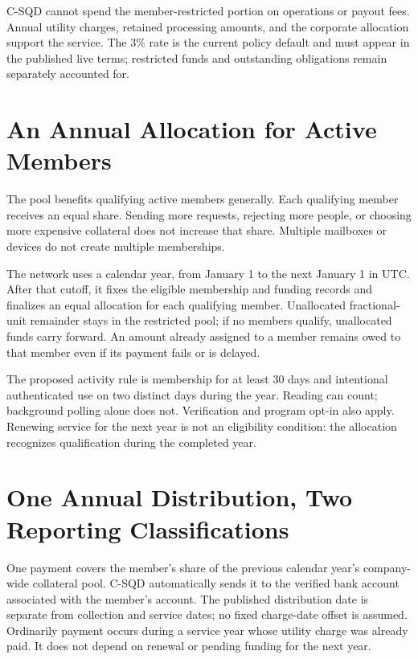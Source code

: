 \documentclass[11pt]{article}
\begin{document}
C-SQD cannot spend the member-restricted portion on operations or payout fees.
Annual utility charges, retained processing amounts, and the corporate allocation
support the service. The 3\% rate is the current policy default and must appear
in the published live terms; restricted funds and outstanding obligations remain
separately accounted for.

\section{An Annual Allocation for Active Members}

The pool benefits qualifying active members generally. Each qualifying member
receives an equal share. Sending more requests, rejecting more people, or choosing
more expensive collateral does not increase that share. Multiple mailboxes or
devices do not create multiple memberships.

The network uses a calendar year, from January 1 to the next January 1 in UTC.
After that cutoff, it fixes the eligible membership and funding records and
finalizes an equal allocation for each qualifying member. Unallocated
fractional-unit remainder stays in the restricted pool; if no members qualify,
unallocated funds carry forward. An amount already assigned to a member remains
owed to that member even if its payment fails or is delayed.

The proposed activity rule is membership for at least 30 days and intentional
authenticated use on two distinct days during the year. Reading can count;
background polling alone does not. Verification and program opt-in also apply.
Renewing service for the next year is not an eligibility condition: the allocation
recognizes qualification during the completed year.

\section{One Annual Distribution, Two Reporting Classifications}

One payment covers the member's share of the previous calendar year's company-wide
collateral pool. C-SQD automatically sends it to the verified bank account
associated with the member's account. The published distribution date is separate
from collection and service dates; no fixed charge-date offset is assumed.
Ordinarily payment occurs during a service year whose utility charge was already
paid. It does not depend on renewal or pending funding for the next year.
\end{document}
